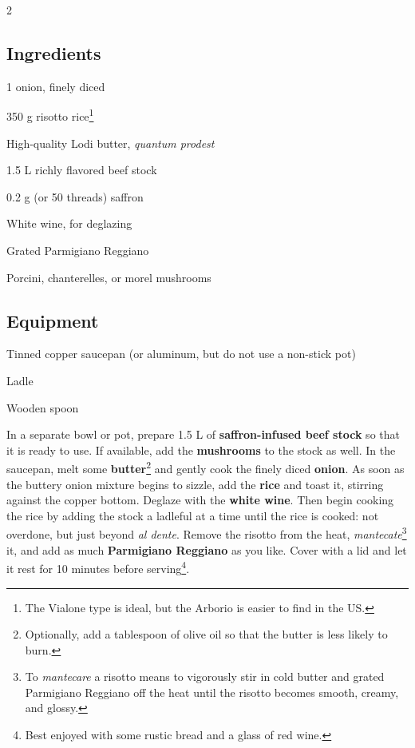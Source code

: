 \newpage
{}

\begin{multicols}{2}
	\subsection*{Ingredients}
	\begin{ingredients}
		\item 1 onion, finely diced
		\item 350 g risotto rice\footnote{The Vialone type is ideal, but the Arborio is easier to find in the US.}
		\item High-quality Lodi butter, \textit{quantum prodest}
		\item 1.5 L richly flavored beef stock
		\item 0.2 g (or 50 threads) saffron
		\item White wine, for deglazing
		\item Grated Parmigiano Reggiano
		\item Porcini, chanterelles, or morel mushrooms
	\end{ingredients}
	
	\columnbreak
	
	\subsection*{Equipment}
	\begin{equipment}
		\item Tinned copper saucepan (or aluminum, but do not use a non-stick pot)
		\item Ladle
		\item Wooden spoon
	\end{equipment}
	\vfill
\end{multicols}

\medskip

In a separate bowl or pot, prepare 1.5 L of \textbf{saffron-infused beef stock} so that it is ready to use.
If available, add the \textbf{mushrooms} to the stock as well.
In the saucepan, melt some \textbf{butter}\footnote{Optionally, add a tablespoon of olive oil so that the butter is less likely to burn.} and gently cook the finely diced \textbf{onion}.
As soon as the buttery onion mixture begins to sizzle, add the \textbf{rice} and toast it, stirring against the copper bottom.
Deglaze with the \textbf{white wine}.
Then begin cooking the rice by adding the stock a ladleful at a time until the rice is cooked: not overdone, but just beyond \textit{al dente}.
Remove the risotto from the heat, \textit{mantecate}\footnote{To \textit{mantecare} a risotto means to vigorously stir in cold butter and grated Parmigiano Reggiano off the heat until the risotto becomes smooth, creamy, and glossy.} it, and add as much \textbf{Parmigiano Reggiano} as you like.
Cover with a lid and let it rest for 10 minutes before serving\footnote{Best enjoyed with some rustic bread and a glass of red wine.}. 

\begin{recipeblock}
	
\end{recipeblock}
